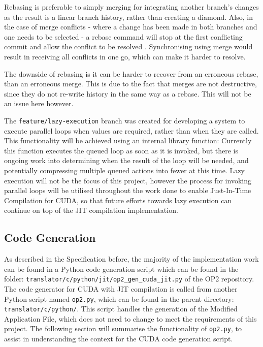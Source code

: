 \par
Rebasing is preferable to simply merging for integrating another branch's changes as the result is a linear branch history, rather than creating a diamond. Also, in the case of merge conflicts - where a change has been made in both branches and one needs to be selected - a rebase command will stop at the first conflicting commit and allow the conflict to be resolved \cite{rebase-doc}. Synchronising using merge would result in receiving all conflicts in one go, which can make it harder to resolve.
\par
The downside of rebasing is it can be harder to recover from an erroneous rebase, than an erroneous merge. This is due to the fact that merges are not destructive, since they do not re-write history in the same way as a rebase. This will not be an issue here however.
\par
The \verb|feature/lazy-execution| branch was created for developing a system to execute parallel loops when values are required, rather than when they are called. This functionality will be achieved using an internal library function:
Currently this function executes the queued loop as soon as it is invoked, but there is ongoing work into determining when the result of the loop will be needed, and potentially compressing multiple queued actions into fewer at this time. Lazy execution will not be the focus of this project, however the process for invoking parallel loops will be utilised throughout the work done to enable Just-In-Time Compilation for CUDA, so that future efforts towards lazy execution can continue on top of the JIT compilation implementation.

\subsection{Code Generation}
\label{ss:codegen}
As described in the Specification before, the majority of the implementation work can be found in a Python code generation script which can be found in the folder: \verb|translator/c/python/jit/op2_gen_cuda_jit.py| of the OP2 repository.
\noindent The code generator for CUDA with JIT compilation is called from another Python script named \verb|op2.py|, which can be found in the parent directory: \verb|translator/c/python/|. This script handles the generation of the Modified Application File, which does not need to change to meet the requirements of this project. The following section will summarise the functionality of \verb|op2.py|, to assist in understanding the context for the CUDA code generation script.

